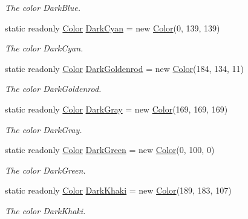 \begin{DoxyCompactItemize}
\begin{DoxyCompactList}\small\item\em The color Dark\-Blue. \end{DoxyCompactList}\item 
static readonly \hyperlink{struct_tri_devs_1_1_tri_engine_1_1_color}{Color} \hyperlink{struct_tri_devs_1_1_tri_engine_1_1_color_a965eb1eb9d2862b670d1dc5db15454f4}{Dark\-Cyan} = new \hyperlink{struct_tri_devs_1_1_tri_engine_1_1_color}{Color}(0, 139, 139)
\begin{DoxyCompactList}\small\item\em The color Dark\-Cyan. \end{DoxyCompactList}\item 
static readonly \hyperlink{struct_tri_devs_1_1_tri_engine_1_1_color}{Color} \hyperlink{struct_tri_devs_1_1_tri_engine_1_1_color_af19964145df54c9d2e1ae1fdd48c0e84}{Dark\-Goldenrod} = new \hyperlink{struct_tri_devs_1_1_tri_engine_1_1_color}{Color}(184, 134, 11)
\begin{DoxyCompactList}\small\item\em The color Dark\-Goldenrod. \end{DoxyCompactList}\item 
static readonly \hyperlink{struct_tri_devs_1_1_tri_engine_1_1_color}{Color} \hyperlink{struct_tri_devs_1_1_tri_engine_1_1_color_a038b2a2ecee6a8a72d90442ae426a522}{Dark\-Gray} = new \hyperlink{struct_tri_devs_1_1_tri_engine_1_1_color}{Color}(169, 169, 169)
\begin{DoxyCompactList}\small\item\em The color Dark\-Gray. \end{DoxyCompactList}\item 
static readonly \hyperlink{struct_tri_devs_1_1_tri_engine_1_1_color}{Color} \hyperlink{struct_tri_devs_1_1_tri_engine_1_1_color_a26a8cd82f97793d30d5fb682b85d59a3}{Dark\-Green} = new \hyperlink{struct_tri_devs_1_1_tri_engine_1_1_color}{Color}(0, 100, 0)
\begin{DoxyCompactList}\small\item\em The color Dark\-Green. \end{DoxyCompactList}\item 
static readonly \hyperlink{struct_tri_devs_1_1_tri_engine_1_1_color}{Color} \hyperlink{struct_tri_devs_1_1_tri_engine_1_1_color_ad0080825ef91c84b41817b693a5406b7}{Dark\-Khaki} = new \hyperlink{struct_tri_devs_1_1_tri_engine_1_1_color}{Color}(189, 183, 107)
\begin{DoxyCompactList}\small\item\em The color Dark\-Khaki. \end{DoxyCompactList}\item 

\end{DoxyCompactItemize}
